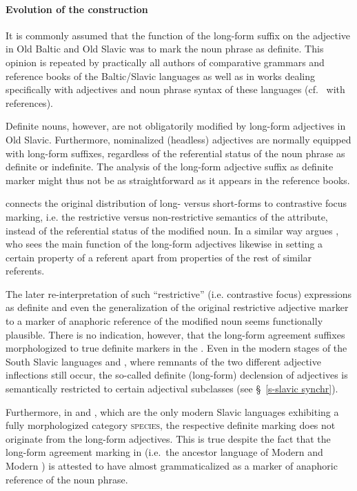 \paragraph{Evolution of the construction} 
It is commonly assumed that the function of the long-form suffix on the adjective in Old Baltic and Old Slavic was to mark the noun phrase as definite. This opinion is repeated by practically all authors of comparative grammars and reference books of the Baltic\slash{}Slavic languages as well as in works dealing specifically with adjectives and noun phrase syntax of these languages (cf.~\citealt[211]{mendoza2004} with references).

Definite nouns, however, are not obligatorily modified by long-form adjectives in Old Slavic. Furthermore, nominalized (headless) adjectives are normally equipped with long-form suffixes, regardless of the referential status of the noun phrase as definite or indefinite. The analysis of the long-form adjective suffix as definite marker might thus not be as straightforward as it appears in the reference books. 

\citet[214–215]{mendoza2004} connects the original distribution of long- versus short-forms to contrastive focus marking, i.e. the restrictive versus non-restrictive semantics of the attribute, instead of the referential status of the modified noun. In a similar way argues \citet{tolstoj1957}, who sees the main function of the long-form adjectives likewise in setting a certain property of a referent apart from properties of the rest of similar referents. 

The later re-interpretation of such “restrictive” (i.e. contrastive focus) expressions as definite and even the generalization of the original restrictive adjective marker to a marker of anaphoric reference of the modified noun seems functionally plausible. There is no indication, however, that the long-form agreement suffixes morphologized to true definite markers in the . Even in the modern stages of the South Slavic languages  and , where remnants of the two different adjective inflections still occur, the so-called definite (long-form) declension of adjectives is semantically restricted to certain adjectival subclasses (see \S~\ref{s-slavic synchr}).

Furthermore, in  and , which are the only modern Slavic languages exhibiting a fully morphologized category \textsc{species}, the respective definite marking does not originate from the long-form adjectives. This is true despite the fact that the long-form agreement marking in  (i.e.~the ancestor language of Modern  and Modern ) is attested to have almost grammaticalized as a marker of anaphoric reference of the noun phrase.

